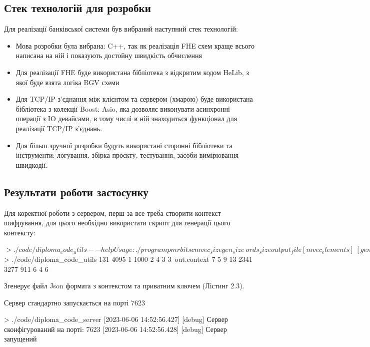 \subsection{Стек технологій для розробки}
Для реалізації банківської системи був вибраний наступний стек технологій:
\begin{itemize}

    \item{Мова розробки була вибрана: C++, так як реалізація FHE схем краще всього написана
на ній і показують достойну швидкість обчислення}
    \item{Для реалізації FHE буде використана бібліотека з відкритим кодом HeLib, з
якої буде взята логіка BGV схеми}
    \item{Для TCP/IP з'єднання між клієнтом та сервером (хмарою) буде використана бібліотека
з колекції Boost: Asio, яка дозволяє виконувати асинхронні операції з IO девайсами, в тому
числі в ній знаходиться функціонал для реалізації TCP/IP з'єднань.}
    \item{Для більш зручної розробки будуть використані сторонні бібліотеки та інструменти:
логування, збірка проєкту, тестування, засоби вимірювання швидкодії.}
\end{itemize}

\subsection{Результати роботи застосунку}

Для коректної роботи з сервером, перш за все треба створити контекст шифрування, для
цього необхідно використати скрипт для генерації цього контексту:

\begin{spverbatim}[breaklines, caption={Команда генерації нового контексту шифрування},
captionpos=b]
$> ./code/diploma_code_utils --help
Usage: ./program p m r bits c mvec_size gen_size \
      ords_size output_file [mvec_elements] \
      [gens_elements] [ords_elements]

$> ./code/diploma_code_utils 131 4095 1 1000 2 4 3 3\
     out.context 7 5 9 13 2341 3277 911 6 4 6
\end{spverbatim}

Згенерує файл Json формата з контекстом та приватним ключем (Лістинг 2.3).

Сервер стандартно запускається на порті 7623
\begin{spverbatim}
> ./code/diploma_code_server
[2023-06-06 14:52:56.427] [debug] Сервер сконфігурований на порті: 7623
[2023-06-06 14:52:56.428] [debug] Сервер запущений
\end{spverbatim}

